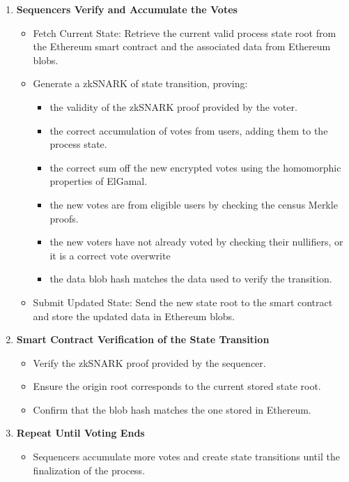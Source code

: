 \begin{enumerate}
	\item \textbf{Sequencers Verify and Accumulate the Votes}

			\begin{itemize}
				\item Fetch Current State: Retrieve the current valid process state root from the Ethereum smart contract and the associated data from Ethereum blobs.
				\item Generate a zkSNARK of state transition, proving: 
						\begin{itemize}
							\item the validity of the zkSNARK proof provided by the voter.
							\item the correct accumulation of votes from users, adding them to the process state.
							\item the correct sum off the new encrypted votes using the homomorphic properties of ElGamal.
							\item the new votes are from eligible users by checking the census Merkle proofs.
							\item the new voters have not already voted by checking their nullifiers, or it is a correct vote overwrite
							\item the data blob hash matches the data used to verify the transition.
						\end{itemize}
				\item Submit Updated State: Send the new state root to the smart contract and store the updated data in Ethereum blobs.
			\end{itemize}
	
	\item \textbf{Smart Contract Verification of the State Transition}

			\begin{itemize}
				\item Verify the zkSNARK proof provided by the sequencer.
				\item Ensure the origin root corresponds to the current stored state root.
				\item Confirm that the blob hash matches the one stored in Ethereum.
			\end{itemize}
	
	\item \textbf{Repeat Until Voting Ends}

			\begin{itemize}
				\item Sequencers accumulate more votes and create state transitions until the finalization of the process.
			\end{itemize}
	

\end{enumerate}
